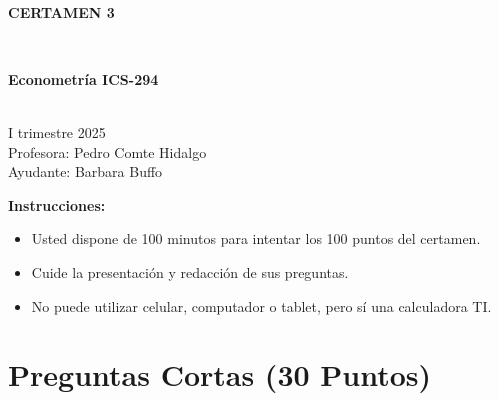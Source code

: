 \documentclass[10pt,a4paper]{article}
\begin{document}
\vspace{5cm}



\begin{center}
\begin{large}
\textbf{\\CERTAMEN 3}
\end{large}\\
\end{center}

\begin{center}
\begin{large}
\textbf{Econometría ICS-294}
\end{large}\\
\vspace{0.2cm}
I trimestre 2025\\
Profesora: Pedro Comte Hidalgo\\
Ayudante: Barbara Buffo
\end{center}

\textbf{Instrucciones:} 

\begin{itemize}

    \item Usted dispone de 100 minutos  para intentar los 100 puntos del certamen.
    \item Cuide la presentación y redacción de sus preguntas.
    \item No puede utilizar celular, computador o tablet, pero sí una calculadora TI.
     
\end{itemize}

\section{Preguntas Cortas (30 Puntos)}
\end{document}
